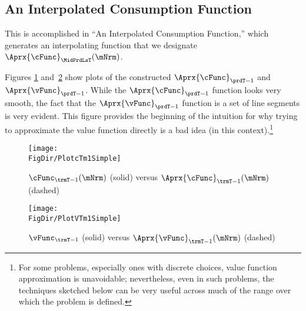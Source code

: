 \documentclass[\econtexRoot/SolvingMicroDSOPs]{subfiles}
\begin{document}


\hypertarget{an-interpolated-consumption-function}{}
\subsection{An Interpolated Consumption Function} \label{subsec:LinInterp}


This is accomplished in ``An Interpolated Consumption Function,'' which generates an interpolating function that we designate $\Aprx{\cFunc}_{\MidPrdLsT}(\mNrm)$. %


Figures \ref{fig:PlotcTm1Simple} and~\ref{fig:PlotVTm1Simple} show
plots of the constructed $\Aprx{\cFunc}_{\prdT-1}$ and $\Aprx{\vFunc}_{\prdT-1}$. While the $\Aprx{\cFunc}_{\prdT-1}$ function looks very smooth, the fact that the $\Aprx{\vFunc}_{\prdT-1}$ function is a set of line segments is very evident.  This figure provides the beginning of the intuition for why trying to approximate the value function directly is a bad idea (in this context).\footnote{For some problems, especially ones with discrete choices, value function approximation is unavoidable; nevertheless, even in such problems, the techniques sketched below can be very useful across much of the range over which the problem is defined.}

\hypertarget{PlotcTm1Simple}{}
\begin{figure}
  \centerline{\texttt{[image: \\FigDir/PlotcTm1Simple]}}
  \caption{$\cFunc_{\trmT-1}(\mNrm)$ (solid) versus $\Aprx{\cFunc}_{\trmT-1}(\mNrm)$ (dashed)}
  \label{fig:PlotcTm1Simple}
\end{figure}

\hypertarget{PlotvTm1Simple}{}
\begin{figure}
  \centerline{\texttt{[image: \\FigDir/PlotVTm1Simple]}}
  \caption{$\vFunc_{\trmT-1}$ (solid) versus $\Aprx{\vFunc}_{\trmT-1}(\mNrm)$ (dashed)}
  \label{fig:PlotVTm1Simple}
\end{figure}
\end{document}
